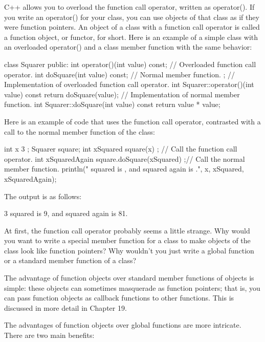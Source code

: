 
C++ allows you to overload the function call operator, written as operator(). If you write an operator() for your class, you can use objects of that class as if they were function pointers. An object of a class with a function call operator is called a function object, or functor, for short. Here is an example of a simple class with an overloaded operator() and a class member function with the same behavior:

\begin{cpp}
class Squarer
{
    public:
        int operator()(int value) const; // Overloaded function call operator.
        int doSquare(int value) const; // Normal member function.
};
// Implementation of overloaded function call operator.
int Squarer::operator()(int value) const { return doSquare(value); }
// Implementation of normal member function.
int Squarer::doSquare(int value) const { return value * value; }
\end{cpp}

Here is an example of code that uses the function call operator, contrasted with a call to the normal member function of the class:

\begin{cpp}
int x { 3 };
Squarer square;
int xSquared { square(x) }; // Call the function call operator.
int xSquaredAgain { square.doSquare(xSquared) };// Call the normal member function.
println("{} squared is {}, and squared again is {}.", x, xSquared, xSquaredAgain);
\end{cpp}

The output is as follows:

\begin{shell}
3 squared is 9, and squared again is 81.
\end{shell}

At first, the function call operator probably seems a little strange. Why would you want to write a special member function for a class to make objects of the class look like function pointers? Why wouldn’t you just write a global function or a standard member function of a class?

The advantage of function objects over standard member functions of objects is simple: these objects can sometimes masquerade as function pointers; that is, you can pass function objects as callback functions to other functions. This is discussed in more detail in Chapter 19.

The advantages of function objects over global functions are more intricate. There are two main benefits:

